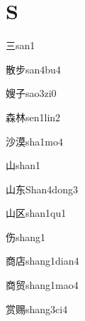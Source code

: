 ﻿%
\section*{S}

\begin{verbete}[3]{三}{san1}
\end{verbete}

\begin{verbete}[12;7]{散步}{san4bu4}
\end{verbete}

\begin{verbete}[12;3]{嫂子}{sao3zi0}
\end{verbete}

\begin{verbete}[12;8]{森林}{sen1lin2}
\end{verbete}

\begin{verbete}[7;13]{沙漠}{sha1mo4}
\end{verbete}

\begin{verbete}[3]{山}{shan1}
\end{verbete}

\begin{verbete}[3;5]{山东}{Shan4dong3}
\end{verbete}

\begin{verbete}[3;4]{山区}{shan1qu1}
\end{verbete}

\begin{verbete}[6]{伤}{shang1}
\end{verbete}

\begin{verbete}[11;8]{商店}{shang1dian4}
\end{verbete}

\begin{verbete}[11;9]{商贸}{shang1mao4}
\end{verbete}

\begin{verbete}[12;12]{赏赐}{shang3ci4}
\end{verbete}

